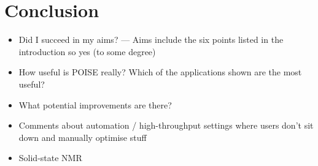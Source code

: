\section{Conclusion}
\label{sec:poise__conclusion}

\begin{itemize}
    \item Did I succeed in my aims? --- Aims include the six points listed in the introduction so yes (to some degree)
    \item How useful is POISE really? Which of the applications shown are the most useful?
    \item What potential improvements are there?
    \item Comments about automation / high-throughput settings where users don't sit down and manually optimise stuff
    \item Solid-state NMR
\end{itemize}

